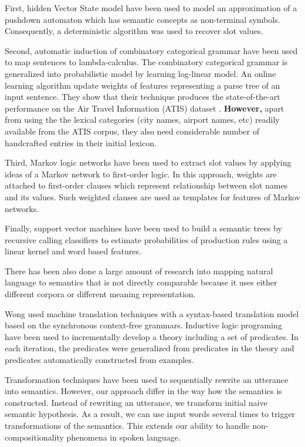 \documentclass[11pt]{article}
\begin{document}
First, hidden Vector State model \cite{he06} have been used to model an approximation of a pushdown automaton which has semantic concepts as non-terminal symbols. Consequently, a deterministic algorithm was used to recover slot values.

Second, automatic induction of combinatory categorical grammar \cite{zettlemoyer07} have been used to map sentences to lambda-calculus. The combinatory categorical grammar is generalized into probabilistic model by learning log-linear model. An online learning algorithm update weights of features representing a parse tree of an input sentence. They show that their technique produces the state-of-the-art performance on the Air Travel Information (ATIS) dataset \cite{atis94}. \textbf{However, }apart from using the the lexical categories (city names, airport names, etc) readily available from the ATIS corpus, they also need considerable number of handcrafted entries in their initial lexicon. 

Third, Markov logic networks \cite{meza08a,meza08b} have been used to extract slot values by applying ideas of a Markov network to first-order logic. In this approach, weights are attached to first-order clauses which represent relationship between slot names and its values. Such weighted clauses are used as templates for features of Markov networks.

Finally, support vector machines \cite{mairesse09} have been used to build a semantic trees by recursive calling classifiers to estimate probabilities of production rules using a linear kernel and word based features.

There has been also done a large amount of research into mapping natural language to semantics that is not directly comparable because it uses either different corpora or different meaning representation. 

Wong \cite{wong06} used machine translation techniques with a syntax-based translation model based on the synchronous context-free grammars. 
Inductive logic programing \cite{tang01} have been used to incrementally develop a theory including a set of predicates. In each iteration, the predicates were generalized from predicates in the theory and predicates automatically constructed from examples. 

Transformation techniques \cite{kate05} have been used to sequentially rewrite an utterance into semantics. However, our approach differ in the way how the semantics is constructed. Instead of rewriting an utterance, we transform initial naive semantic hypothesis. As a result, we can use input words several times to trigger transformations of the semantics. This extends our ability to handle non-compositionality phenomena in spoken language.
\end{document}
